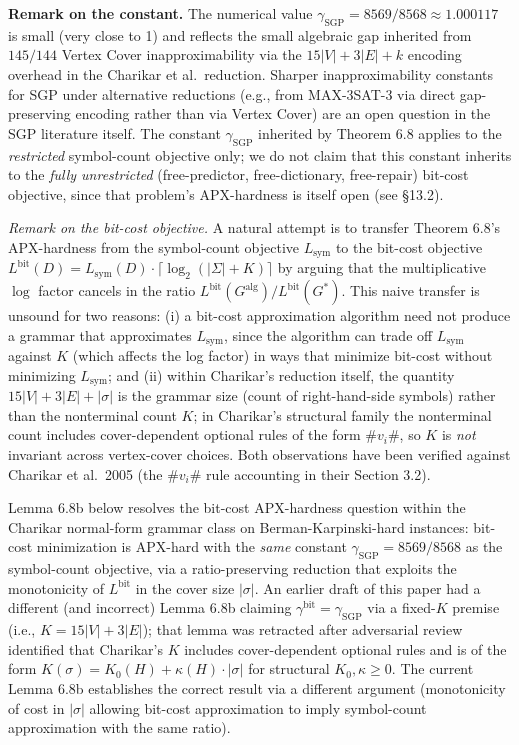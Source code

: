 \documentclass[
]{article}
\begin{document}
\textbf{Remark on the constant.} The numerical value
$\gamma_{\mathrm{SGP}} = 8569/8568 \approx 1.000117$ is small (very
close to 1) and reflects the small algebraic gap inherited from
$145/144$ Vertex Cover inapproximability via the
$15|V| + 3|E| + k$ encoding overhead in the Charikar et al.\
reduction. Sharper inapproximability constants for SGP under
alternative reductions (e.g., from MAX-3SAT-3 via direct
gap-preserving encoding rather than via Vertex Cover) are an open
question in the SGP literature itself. The constant
$\gamma_{\mathrm{SGP}}$ inherited by Theorem 6.8 applies to the
\emph{restricted} symbol-count objective only; we do not claim
that this constant inherits to the \emph{fully unrestricted}
(free-predictor, free-dictionary, free-repair) bit-cost objective,
since that problem's APX-hardness is itself open (see §13.2).

\emph{Remark on the bit-cost objective.} A natural attempt is to
transfer Theorem 6.8's APX-hardness from the symbol-count
objective $L_{\mathrm{sym}}$ to the bit-cost objective
$L^{\mathrm{bit}}(D) = L_{\mathrm{sym}}(D) \cdot
\lceil \log_2(|\Sigma|+K) \rceil$ by arguing that the
multiplicative $\log$ factor cancels in the ratio
$L^{\mathrm{bit}}(G^{\mathrm{alg}})/L^{\mathrm{bit}}(G^*)$. This
naive transfer is unsound for two reasons: (i) a bit-cost
approximation algorithm need not produce a grammar that approximates
$L_{\mathrm{sym}}$, since the algorithm can trade off
$L_{\mathrm{sym}}$ against $K$ (which affects the log factor) in
ways that minimize bit-cost without minimizing $L_{\mathrm{sym}}$;
and (ii) within Charikar's reduction itself, the quantity
$15|V| + 3|E| + |\sigma|$ is the grammar size (count of
right-hand-side symbols) rather than the nonterminal count $K$;
in Charikar's structural family the nonterminal count includes
cover-dependent optional rules of the form $\#v_i\#$, so $K$ is
\emph{not} invariant across vertex-cover choices. Both observations
have been verified against Charikar et al.\ 2005 (the
$\#v_i\#$ rule accounting in their Section 3.2).

Lemma 6.8b below resolves the bit-cost APX-hardness question within
the Charikar normal-form grammar class on Berman-Karpinski-hard
instances: bit-cost minimization is APX-hard with the \emph{same}
constant $\gamma_{\mathrm{SGP}} = 8569/8568$ as the symbol-count
objective, via a ratio-preserving reduction that exploits the
monotonicity of $L^{\mathrm{bit}}$ in the cover size $|\sigma|$. An
earlier draft of this paper had a different (and incorrect) Lemma
6.8b claiming $\gamma^{\mathrm{bit}} = \gamma_{\mathrm{SGP}}$ via a
fixed-$K$ premise (i.e., $K = 15|V| + 3|E|$); that lemma was
retracted after adversarial review identified that Charikar's $K$
includes cover-dependent optional rules and is of the form
$K(\sigma) = K_0(H) + \kappa(H) \cdot |\sigma|$ for structural
$K_0, \kappa \geq 0$. The current Lemma 6.8b establishes the correct
result via a different argument (monotonicity of cost in $|\sigma|$
allowing bit-cost approximation to imply symbol-count approximation
with the same ratio).
\end{document}
